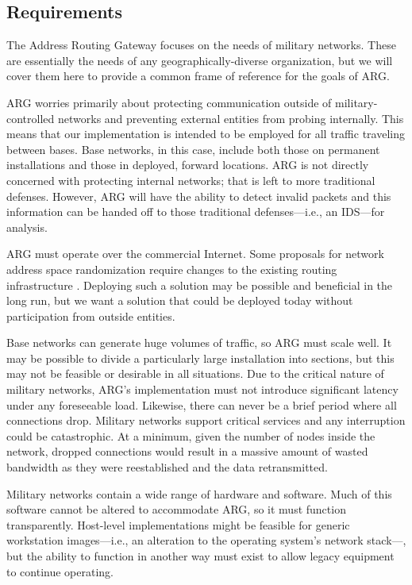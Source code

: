 \subsection{Requirements}
\par The Address Routing Gateway focuses on the needs of military networks. These are essentially the needs of any geographically-diverse organization, but we will cover them here to provide a common frame of reference for the goals of ARG. 

\par ARG worries primarily about protecting communication outside of military-controlled networks and preventing external entities from probing internally. This means that our implementation is intended to be employed for all traffic traveling between bases. Base networks, in this case, include both those on permanent installations and those in deployed, forward locations. ARG is not directly concerned with protecting internal networks; that is left to more traditional defenses. However, ARG will have the ability to detect invalid packets and this information can be handed off to those traditional defenses---i.e., an IDS---for analysis.

\par ARG must operate over the commercial Internet. Some proposals for network address space randomization require changes to the existing routing infrastructure \cite{CONTRA}. Deploying such a solution may be possible and beneficial in the long run, but we want a solution that could be deployed today without participation from outside entities.

\par Base networks can generate huge volumes of traffic, so ARG must scale well. It may be possible to divide a particularly large installation into sections, but this may not be feasible or desirable in all situations. Due to the critical nature of military networks, ARG's implementation must not introduce significant latency under any foreseeable load. Likewise, there can never be a brief period where all connections drop. Military networks support critical services and any interruption could be catastrophic. At a minimum, given the number of nodes inside the network, dropped connections would result in a massive amount of wasted bandwidth as they were reestablished and the data retransmitted.

\par Military networks contain a wide range of hardware and software. Much of this software cannot be altered to accommodate ARG, so it must function transparently. Host-level implementations might be feasible for generic workstation images---i.e., an alteration to the operating system's network stack---, but the ability to function in another way must exist to allow legacy equipment to continue operating.

